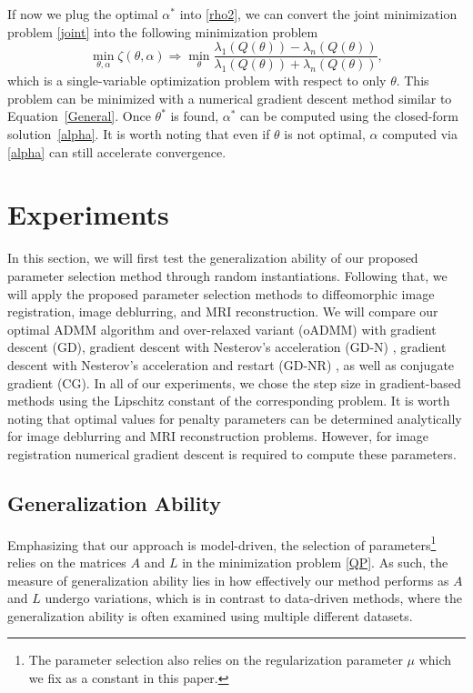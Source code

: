 \documentclass[letterpaper]{article} %
\begin{document}
If now we plug the optimal $\alpha^*$ into \eqref{rho2}, we can convert the joint minimization problem \eqref{joint} into the following minimization problem
 \begin{equation}\label{theta3}
 	\min_{\theta, \alpha} \zeta\left(\theta, \alpha \right) \Rightarrow \min_{\theta} \frac{\lambda_1 (Q\left(\theta\right))-\lambda_n (Q\left(\theta\right))}{\lambda_1\left(Q\left(\theta\right)\right)+\lambda_n\left(Q\left(\theta\right)\right)},
 \end{equation}
which is a single-variable optimization problem with respect to only $\theta$. This problem can be minimized with a numerical gradient descent method similar to Equation~\eqref{General}. Once $\theta^*$ is found, $\alpha^*$ can be computed using the closed-form solution~\eqref{alpha}. It is worth noting that even if $\theta$ is not optimal, $\alpha$ computed via \eqref{alpha} can still accelerate convergence.

\section{Experiments}
In this section,  we will first test the generalization ability of our proposed parameter selection method through random instantiations. Following that, we will apply the proposed parameter selection methods to diffeomorphic image registration, image deblurring, and MRI reconstruction. We will compare our optimal ADMM algorithm and over-relaxed variant (oADMM) with gradient descent (GD), gradient descent with Nesterov's acceleration (GD-N) \cite{nesterov1983method,bartlett2021accelerated}, gradient descent with Nesterov's acceleration and restart (GD-NR) \cite{o2015adaptive,bartlett2021accelerated}, as well as conjugate gradient (CG). In all of our experiments, we chose the step size in gradient-based methods using the Lipschitz constant of the corresponding problem. It is worth noting that optimal values for penalty parameters can be determined analytically for image deblurring and MRI reconstruction problems. However, for image registration numerical gradient descent is required to compute these parameters.

\subsection{Generalization Ability}
Emphasizing that our approach is model-driven, the selection of parameters\footnote{The parameter selection also relies on the regularization parameter $\mu$ which we fix as a constant in this paper.} relies on the matrices $A$ and $L$ in the minimization problem \eqref{QP}. As such, the measure of generalization ability lies in how effectively our method performs as $A$ and $L$ undergo variations, which is in contrast to data-driven methods, where the generalization ability is often examined using multiple different datasets.
\end{document}
